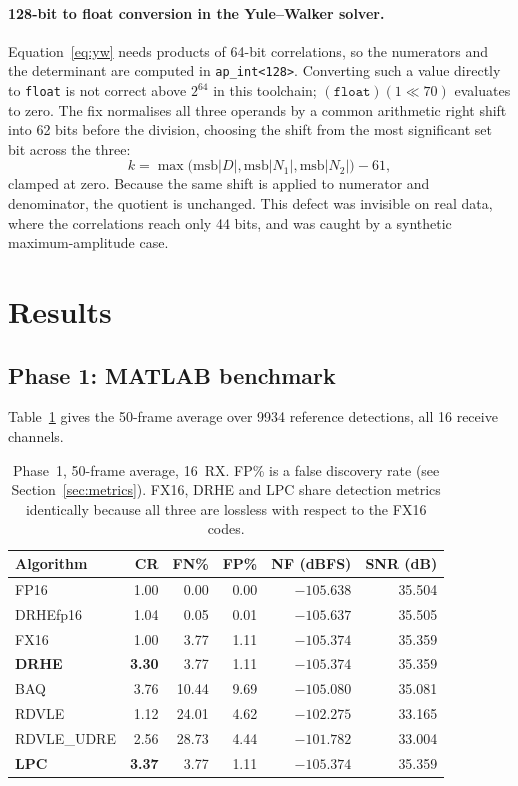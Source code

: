 \documentclass[10pt,twocolumn]{article}
\begin{document}
\paragraph{128-bit to float conversion in the Yule--Walker solver.}
Equation~\eqref{eq:yw} needs products of 64-bit correlations, so the numerators
and the determinant are computed in \texttt{ap\_int<128>}. Converting such a
value directly to \texttt{float} is not correct above $2^{64}$ in this
toolchain; $(\texttt{float})(1 \ll 70)$ evaluates to zero. The fix normalises
all three operands by a common arithmetic right shift into 62 bits before the
division, choosing the shift from the most significant set bit across the three:
\begin{equation}
k = \max\bigl(\mathrm{msb}|D|, \mathrm{msb}|N_1|, \mathrm{msb}|N_2|\bigr) - 61,
\end{equation}
clamped at zero. Because the same shift is applied to numerator and
denominator, the quotient is unchanged. This defect was invisible on real data,
where the correlations reach only 44 bits, and was caught by a synthetic
maximum-amplitude case.

\section{Results}
\label{sec:results}

\subsection{Phase 1: MATLAB benchmark}

Table~\ref{tab:phase1} gives the 50-frame average over \num{9934} reference
detections, all 16 receive channels.

\begin{table}[t]
\centering
\caption{Phase~1, 50-frame average, 16~RX. FP\% is a false discovery rate (see
Section~\ref{sec:metrics}). FX16, DRHE and LPC share detection metrics
identically because all three are lossless with respect to the FX16 codes.}
\label{tab:phase1}
\small
\setlength{\tabcolsep}{4pt}
\begin{tabular}{lrrrrr}
\toprule
Algorithm & CR & FN\% & FP\% & NF (dBFS) & SNR (dB)\\
\midrule
FP16        & 1.00 & 0.00  & 0.00 & $-105.638$ & 35.504\\
DRHEfp16    & 1.04 & 0.05  & 0.01 & $-105.637$ & 35.505\\
FX16        & 1.00 & 3.77  & 1.11 & $-105.374$ & 35.359\\
\textbf{DRHE} & \textbf{3.30} & 3.77 & 1.11 & $-105.374$ & 35.359\\
BAQ         & 3.76 & 10.44 & 9.69 & $-105.080$ & 35.081\\
RDVLE       & 1.12 & 24.01 & 4.62 & $-102.275$ & 33.165\\
RDVLE\_UDRE & 2.56 & 28.73 & 4.44 & $-101.782$ & 33.004\\
\textbf{LPC} & \textbf{3.37} & 3.77 & 1.11 & $-105.374$ & 35.359\\
\bottomrule
\end{tabular}
\end{table}
\end{document}
